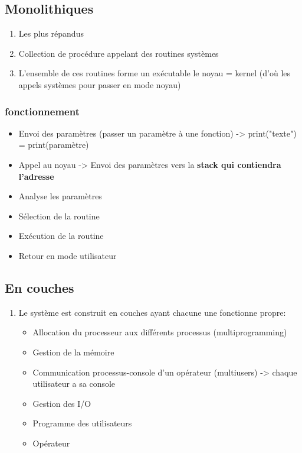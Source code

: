 \subsection{Monolithiques}
\begin{enumerate}
\item Les plus répandus
\item Collection de procédure appelant des routines systèmes
\item L'ensemble de ces routines forme un exécutable le noyau = kernel (d'où les appels systèmes pour passer en mode noyau)
\end{enumerate}
\subsubsection{fonctionnement}
\begin{itemize}
  \item Envoi des paramètres (passer un paramètre à une fonction) -> print("texte") = print(paramètre)
  \item Appel au noyau -> Envoi des paramètres vers la \textbf{stack qui contiendra l'adresse}
  \item Analyse les paramètres 
  \item Sélection de la routine
  \item Exécution de la routine
  \item Retour en mode utilisateur
\end{itemize}

\subsection{En couches}
\begin{enumerate}
\item Le système est construit en couches ayant chacune une fonctionne propre:
\begin{itemize}
  \item Allocation du processeur aux différents processus (multiprogramming)
  \item Gestion de la mémoire
  \item Communication processus-console d'un opérateur (multiusers) -> chaque utilisateur a sa console
  \item Gestion des I/O
  \item Programme des utilisateurs
  \item Opérateur
\end{itemize}
\end{enumerate}

